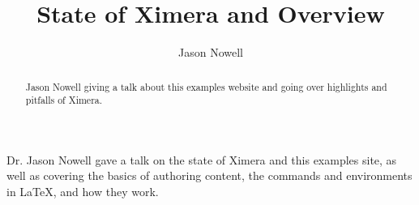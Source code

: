 \documentclass{ximera}
\title{State of Ximera and Overview}
\author{Jason Nowell}
\begin{document}
\begin{abstract}
    Jason Nowell giving a talk about this examples website and going over highlights and pitfalls of Ximera.
\end{abstract}
\maketitle

Dr. Jason Nowell gave a talk on the state of Ximera and this examples site, as well as covering the basics of authoring content, the commands and environments in LaTeX, and how they work.

\end{document}
